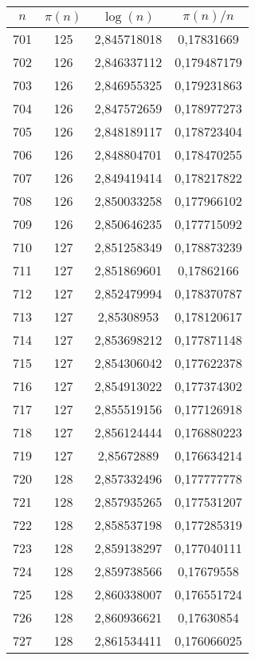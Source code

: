 {\begin{minipage}[!h]{0.45\textwidth}\centering
\tiny
\begin{longtable}{cccc} \hline
\(n\) & \(\pi(n)\) & \(\log(n)\) & \(\pi(n)/n\) \\ \hline
701 & 125 & 2,845718018 & 0,17831669 \\ \hline
702 & 126 & 2,846337112 & 0,179487179 \\ \hline
703 & 126 & 2,846955325 & 0,179231863 \\ \hline
704 & 126 & 2,847572659 & 0,178977273 \\ \hline
705 & 126 & 2,848189117 & 0,178723404 \\ \hline
706 & 126 & 2,848804701 & 0,178470255 \\ \hline
707 & 126 & 2,849419414 & 0,178217822 \\ \hline
708 & 126 & 2,850033258 & 0,177966102 \\ \hline
709 & 126 & 2,850646235 & 0,177715092 \\ \hline
710 & 127 & 2,851258349 & 0,178873239 \\ \hline
711 & 127 & 2,851869601 & 0,17862166 \\ \hline
712 & 127 & 2,852479994 & 0,178370787 \\ \hline
713 & 127 & 2,85308953 & 0,178120617 \\ \hline
714 & 127 & 2,853698212 & 0,177871148 \\ \hline
715 & 127 & 2,854306042 & 0,177622378 \\ \hline
716 & 127 & 2,854913022 & 0,177374302 \\ \hline
717 & 127 & 2,855519156 & 0,177126918 \\ \hline
718 & 127 & 2,856124444 & 0,176880223 \\ \hline
719 & 127 & 2,85672889 & 0,176634214 \\ \hline
720 & 128 & 2,857332496 & 0,177777778 \\ \hline
721 & 128 & 2,857935265 & 0,177531207 \\ \hline
722 & 128 & 2,858537198 & 0,177285319 \\ \hline
723 & 128 & 2,859138297 & 0,177040111 \\ \hline
724 & 128 & 2,859738566 & 0,17679558 \\ \hline
725 & 128 & 2,860338007 & 0,176551724 \\ \hline
726 & 128 & 2,860936621 & 0,17630854 \\ \hline
727 & 128 & 2,861534411 & 0,176066025 \\ \hline

\end{longtable}
\end{minipage}}
